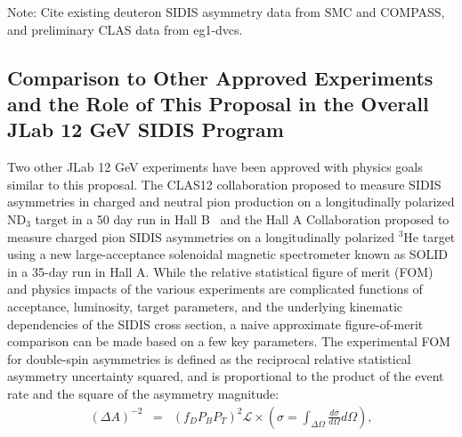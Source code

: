 Note: Cite existing deuteron SIDIS asymmetry data from SMC and COMPASS, and preliminary CLAS data from eg1-dvcs.
\subsection{Comparison to Other Approved Experiments and the Role of This Proposal in the Overall JLab 12 GeV SIDIS Program}
Two other JLab 12 GeV experiments have been approved with physics goals similar to this proposal. The CLAS12 collaboration proposed to measure SIDIS asymmetries in charged and neutral pion production on a longitudinally polarized ND$_3$ target in a 50 day run in Hall B~\cite{CLAS12_ND3_longitudinal} and the Hall A Collaboration proposed to measure charged pion SIDIS asymmetries on a longitudinally polarized $^3$He target using a new large-acceptance solenoidal magnetic spectrometer known as SOLID~\cite{SOLID_He3_longitudinal} in a 35-day run in Hall A. While the relative statistical figure of merit (FOM) and physics impacts of the various experiments are complicated functions of acceptance, luminosity, target parameters, and the underlying kinematic dependencies of the SIDIS cross section, a naive approximate figure-of-merit comparison can be made based on a few key parameters. The experimental FOM for double-spin asymmetries is defined as the reciprocal relative statistical asymmetry uncertainty squared, and is proportional to the product of the event rate and the square of the asymmetry magnitude: 
\begin{eqnarray}
  (\Delta A)^{-2} &=& (f_D P_B P_T)^2 \mathcal{L} \times \left( \sigma = \int_{\Delta \Omega} \frac{d\sigma}{d\Omega} d \Omega \right), 
\end{eqnarray} 
